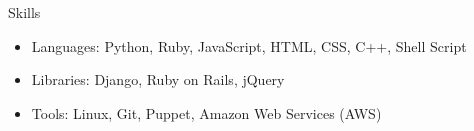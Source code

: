 \documentclass[11pt,oneside]{article}
\newenvironment{ressection}[1]{
    \textrm{\Large#1}
    \begin{itemize}
}{
    \end{itemize}
}
\newcommand{\resitem}[1]{
    \item \begin{flushleft} \textsf{#1} \end{flushleft}
}
\begin{document}
\begin{ressection}{Skills}
    \resitem{
        \textrm{Languages:}
        Python,
        Ruby,
        JavaScript,
        HTML,
        CSS,
        C++,
        Shell Script
    }

    \resitem{
        \textrm{Libraries:}
        Django,
        Ruby on Rails,
        jQuery
    }

    \resitem{
        \textrm{Tools:}
        Linux,
        Git,
        Puppet,
        Amazon Web Services (AWS)
    }
\end{ressection}
\end{document}
